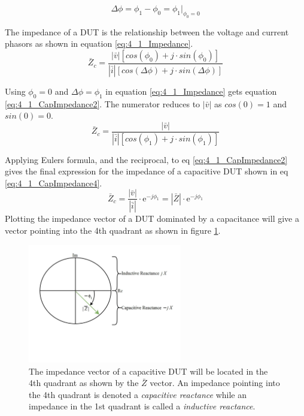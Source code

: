 \begin{equation}\label{eq:4_1_CapPhase}
    \Delta \phi = \phi_1 - \phi_0=\phi_1 \bigg\rvert_{\phi_0 = 0}
\end{equation}

The impedance of a DUT is the relationship between the voltage and current phasors as shown in equation \ref{eq:4_1_Impedance}.
\begin{equation}\label{eq:4_1_Impedance}
    \bar Z_c = \frac{|\bar v| [cos(\phi_0) +j\cdot sin(\phi_0)]}{|\bar i| [cos(\Delta \phi) +j\cdot sin(\Delta \phi)]}
\end{equation}

Using $\phi_0 = 0$ and $\Delta \phi = \phi_1$ in equation \ref{eq:4_1_Impedance} gets equation \ref{eq:4_1_CapImpedance2}. The numerator reduces to $|\bar v|$ as $cos(0) =1$ and $sin(0) = 0$.
\begin{equation}\label{eq:4_1_CapImpedance2}
    \bar Z_c = \frac{|\bar v|}{|\bar i| [cos(\phi_1) +j\cdot sin(\phi_1)]}
\end{equation}

Applying Eulers formula, and the reciprocal, to eq \ref{eq:4_1_CapImpedance2} gives the final expression for the impedance of a capacitive DUT shown in eq \ref{eq:4_1_CapImpedance4}.
\begin{equation}\label{eq:4_1_CapImpedance4}
    \bar Z_c = \frac{|\bar v|}{|\bar i|} \cdot \mathrm e^{-j\phi_1} = |\bar Z| \cdot \mathrm e^{-j\phi_1} 
\end{equation}
Plotting the impedance vector of a DUT dominated by a capacitance will give a vector pointing into the 4th quadrant as shown in figure \ref{fig:4_1_CapImpedance}.
\begin{figure}[H]
    \centering
    \includegraphics[clip, trim=0 175 0 0, width=0.60\textwidth]{Sections/4_TechnicalAnalysis/Figures/4_1_CapImpedance.pdf}
    \caption{The impedance vector of a capacitive DUT will be located in the 4th quadrant as shown by the $\bar Z$ vector. An impedance pointing into the 4th quadrant is denoted a \textit{capacitive reactance} while an impedance in the 1st quadrant is called a \textit{inductive reactance}.}
    \label{fig:4_1_CapImpedance}
\end{figure}

